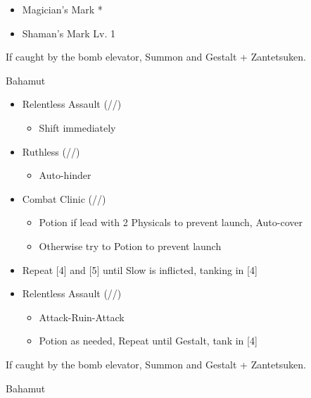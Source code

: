 \begin{paracol}{2}
\begin{menu}
\begin{itemize}
\begin{itemize}
\begin{itemize}
                \item Magician's Mark *
                \item Shaman's Mark Lv. 1
        \end{itemize}
    \end{itemize}
\end{itemize}
\end{menu}
\switchcolumn*
	If caught by the bomb elevator, Summon and Gestalt + Zantetsuken.
	\renewcommand{\first}{[1] Relentless Assault (\com/\rav/\rav)}
	\renewcommand{\fifth}{[5] Ruthless (\sab/\com/\rav)
		\renewcommand{\fourth}{[4] Combat Clinic (\sen/\med/\med)}}
	\begin{battle}{Bahamut}
		\begin{itemize}
			\item \first
			      \begin{itemize}
				      \item Shift immediately
			      \end{itemize}
			\item \fifth
			      \begin{itemize}
				      \item Auto-hinder
			      \end{itemize}
			\item \fourth
			      \begin{itemize}
				      \item Potion if lead with 2 Physicals to prevent launch, Auto-cover
				      \item Otherwise try to Potion to prevent launch
			      \end{itemize}
			\item Repeat [4] and [5] until Slow is inflicted, tanking in [4]
			\item \first
			      \begin{itemize}
				      \item Attack-Ruin-Attack
				      \item Potion as needed, Repeat until Gestalt, tank in [4]
			      \end{itemize}
		\end{itemize}
	\end{battle}
	\switchcolumn
		If caught by the bomb elevator, Summon and Gestalt + Zantetsuken.
	\begin{battle}{Bahamut}

\end{battle}
\end{paracol}
